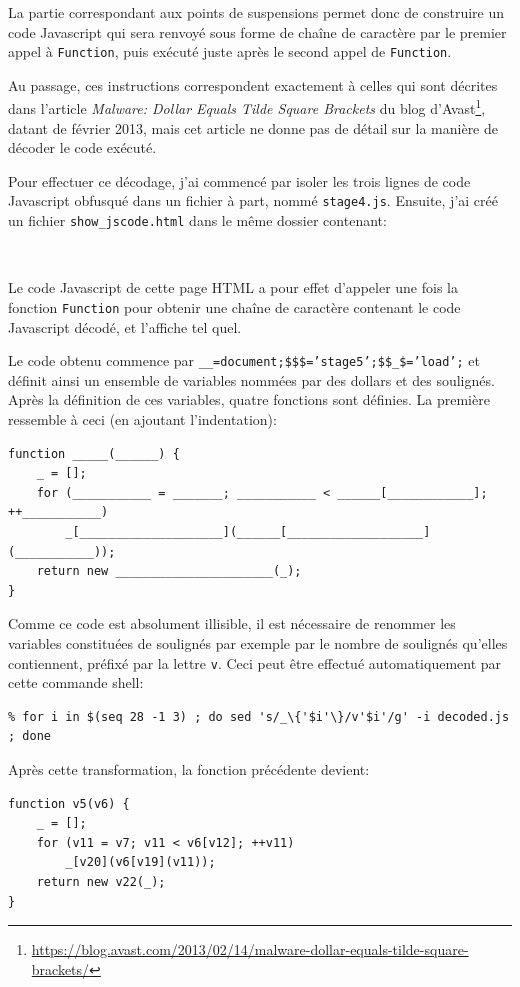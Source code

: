 \documentclass[a4paper,10pt]{article}
\newcommand{\pyinput}[1]{%
    \noindent{\color[rgb]{0.5, 0.5, 0.5}{\rule{\textwidth}{0.4pt}}}
     \\
    \noindent{\color[rgb]{0.5, 0.5, 0.5}{\rule{\textwidth}{0.4pt}}}
}
\begin{document}
La partie correspondant aux points de suspensions permet donc de construire un code Javascript qui sera renvoyé sous forme de chaîne de caractère par le premier appel à \texttt{Function}, puis exécuté juste après le second appel de \texttt{Function}.

Au passage, ces instructions correspondent exactement à celles qui sont décrites dans l'article \textit{Malware: Dollar Equals Tilde Square Brackets} du blog d'Avast\footnote{\url{https://blog.avast.com/2013/02/14/malware-dollar-equals-tilde-square-brackets/}}, datant de février 2013, mais cet article ne donne pas de détail sur la manière de décoder le code exécuté.

Pour effectuer ce décodage, j'ai commencé par isoler les trois lignes de code Javascript obfusqué dans un fichier à part, nommé \texttt{stage4.js}. Ensuite, j'ai créé un fichier \texttt{show\_jscode.html} dans le même dossier contenant:

\pyinput{stage4/show_jscode.html.inc.tex}

Le code Javascript de cette page HTML a pour effet d'appeler une fois la fonction \texttt{Function} pour obtenir une chaîne de caractère contenant le code Javascript décodé, et l'affiche tel quel.

Le code obtenu commence par \texttt{\_\_=document;\$\$\$='stage5';\$\$\_\$='load';} et définit ainsi un ensemble de variables nommées par des dollars et des soulignés.
Après la définition de ces variables, quatre fonctions sont définies.
La première ressemble à ceci (en ajoutant l'indentation):
\begin{verbatim}
function _____(______) {
    _ = [];
    for (___________ = _______; ___________ < ______[____________]; ++___________)
        _[____________________](______[___________________](___________));
    return new ______________________(_);
}
\end{verbatim}

Comme ce code est absolument illisible, il est nécessaire de renommer les variables constituées de soulignés par exemple par le nombre de soulignés qu'elles contiennent, préfixé par la lettre \texttt{v}.
Ceci peut être effectué automatiquement par cette commande shell:
\begin{verbatim}
% for i in $(seq 28 -1 3) ; do sed 's/_\{'$i'\}/v'$i'/g' -i decoded.js ; done
\end{verbatim}

Après cette transformation, la fonction précédente devient:
\begin{verbatim}
function v5(v6) {
    _ = [];
    for (v11 = v7; v11 < v6[v12]; ++v11)
        _[v20](v6[v19](v11));
    return new v22(_);
}
\end{verbatim}
\end{document}
